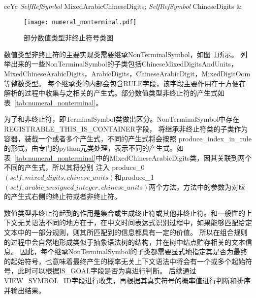 \begin{table}[b]
\begin{tabularx}{\linewidth}{ccYc}
        \textit{SelfRefSymbol} \rightarrow  MixedArabicChineseDigits;
        \textit{SelfRefSymbol} \rightarrow  ChineseDigits &                                                                                                                                                                          \\
        \bottomrule
    \end{tabularx}
    \label{tab:numeral_nonterminal}
\end{table}

\begin{figure}[hbt]
    \centering
    \texttt{[image: numeral\_nonterminal.pdf]}
    \caption{部分数值类型非终止符号类图}
    \label{fig:numeral_nonterminal}
\end{figure}

数值类型非终止符的主要实现类需要继承NonTerminalSymbol，如图~\ref{fig:numeral_nonterminal}所示。
列举出来的一些NonTerminalSymbol的子类包括ChineseMixedDigitsAndUnits，MixedChineseArabicDigits，ArabicDigits，ChineseArabicDigit，MixedDigitOom等整数类型。
每个继承类的内部会包含RULE字段，该字段主要作用在于方便在解析的过程中收集与之相关的产生式。部分数值类型非终止符的产生式如表~\ref{tab:numeral_nonterminal}。

为了和非终止符，即TerminalSymbol类做出区分。NonTerminalSymbol中存在REGISTRABLE\_THIS\_IS\_CONTAINER字段，
将继承非终止符类的子类作为容器，装载一个或者多个产生式，不同的产生式将会按照
produce\_index\_in\_rule的形式，由专门的python元类处理，表示不同的产生式。如表~\ref{tab:numeral_nonterminal}中的MixedChineseArabicDigits类，因其关联到两个不同的产生式，所以其将分别
注入 produce\_0$\left(self,mixed\_digits,chinese\_units\right)$和produce\_1$\left(self,arabic\_unsigned\_integer,chinese\_units\right)$两个方法，方法中的参数为对应的产生式右侧的终止符或者非终止符。

数值类型非终止符起到的作用是集合或生成终止符或其他非终止符。和一般性的上下文无关语法不同的地方在于，在中文时间表达式识别过程中，如果能够匹配给定文本中的一部分规则，则其所匹配到的信息都具有一定的价值。
所以在组合规则的过程中会自然地形成类似于抽象语法树的结构，并在树中结点贮存相关的文本信息。
因此，每个继承NonTerminalSymbol的子类都需要显式地指定其是否为最终的起始符号，也意味着最终产生的概率无关上下文语法中将会有一个或多个起始符号，此时可以根据IS\_GOAL字段是否为真进行判断。
后续通过VIEW\_SYMBOL\_ID字段进行收集，再根据其真实符号的概率值进行判断和排序并输出结果。

